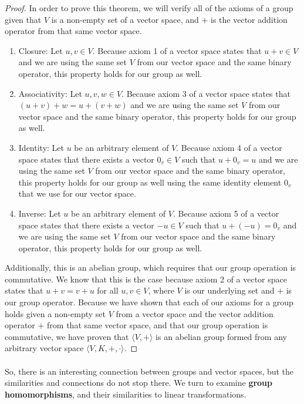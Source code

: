 \documentclass{article}
\newcommand{\done}{\renewcommand\qedsymbol{$\blacksquare$}}
\begin{document}
\begin{proof}
    In order to prove this theorem, we will verify all of the axioms of a group
    given that $V$ is a non-empty set of a vector space, and $+$ is the vector 
    addition operator from that same vector space. 
    \begin{enumerate}
      \item Closure: Let $u,v \in V$. Because axiom 1 of a vector space states that
      $u+v \in V$ and we are using the same set $V$ from our vector space and the 
      same binary operator, this property holds for our group as well.
      \item Associativity: Let $u,v,w \in V$. Because axiom 3 of a vector space states that
      $(u+v)+w = u+(v+w)$ and we are using the same set $V$ from our vector space and the
      same binary operator, this property holds for our group as well.
      \item Identity: Let $u$ be an arbitrary element of $V$. Because axiom 4 of a vector space states that
      there exists a vector $0_v \in V$ such that $u+0_v = u$ and we are using the same set $V$ from our vector space and the
      same binary operator, this property holds for our group as well using the 
      same identity element $0_v$ that we use for our vector space.
      \item Inverse: Let $u$ be an arbitrary element of $V$. Because axiom 5 of a vector space states that
      there exists a vector $-u \in V$ such that $u+(-u) = 0_v$ and we are using the same set $V$ from our vector space and the
      same binary operator, this property holds for our group as well.
    \end{enumerate}

Additionally, this is an abelian group, which requires that our group operation 
is commutative. We know that this is the case because axiom 2 of a vector space states that
$u+v = v+u$ for all $u,v \in V$, where $V$ is our underlying set and $+$ is our group operator.
Because we have shown that each of our axioms for a group holds given a non-empty 
set $V$ from a vector space and the vector addition operator $+$ from that same
vector space, and that our group operation is commutative, we have proven that
$\langle V, + \rangle$ is an abelian group formed from any arbitrary vector space 
$\langle V, K, +, \cdot \rangle$.
\done  
\end{proof}

\paragraph*{} So, there is an interesting connection between groups and vector spaces,
but the similarities and connections do not stop there. We turn to examine 
\textbf{group homomorphisms}, and their similarities to linear transformations.
\end{document}
